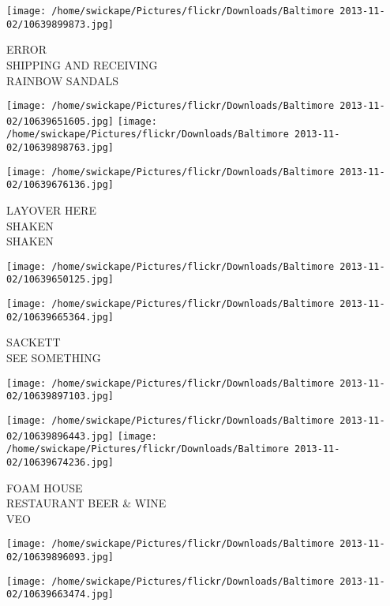 \documentclass[10pt,letterpaper]{article}
\begin{document}
\vspace{0.25in}
\texttt{[image: /home/swickape/Pictures/flickr/Downloads/Baltimore 2013-11-02/10639899873.jpg]}

ERROR\\
SHIPPING AND RECEIVING\\
RAINBOW SANDALS\\
\pagebreak

\texttt{[image: /home/swickape/Pictures/flickr/Downloads/Baltimore 2013-11-02/10639651605.jpg]}
\texttt{[image: /home/swickape/Pictures/flickr/Downloads/Baltimore 2013-11-02/10639898763.jpg]}

\vspace{0.25in}
\texttt{[image: /home/swickape/Pictures/flickr/Downloads/Baltimore 2013-11-02/10639676136.jpg]}

LAYOVER HERE\\
SHAKEN\\
SHAKEN\\
\pagebreak

\texttt{[image: /home/swickape/Pictures/flickr/Downloads/Baltimore 2013-11-02/10639650125.jpg]}

\vspace{0.25in}
\texttt{[image: /home/swickape/Pictures/flickr/Downloads/Baltimore 2013-11-02/10639665364.jpg]}

SACKETT\\
SEE SOMETHING\\
\pagebreak

\texttt{[image: /home/swickape/Pictures/flickr/Downloads/Baltimore 2013-11-02/10639897103.jpg]}

\vspace{0.25in}
\texttt{[image: /home/swickape/Pictures/flickr/Downloads/Baltimore 2013-11-02/10639896443.jpg]}
\texttt{[image: /home/swickape/Pictures/flickr/Downloads/Baltimore 2013-11-02/10639674236.jpg]}

FOAM HOUSE\\
RESTAURANT BEER \& WINE\\
VEO\\
\pagebreak

\texttt{[image: /home/swickape/Pictures/flickr/Downloads/Baltimore 2013-11-02/10639896093.jpg]}

\vspace{0.25in}
\texttt{[image: /home/swickape/Pictures/flickr/Downloads/Baltimore 2013-11-02/10639663474.jpg]}
\end{document}
